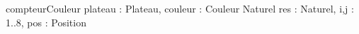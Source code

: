 \begin{algorithme}

  \fonction
      {compteurCouleur}
      {plateau : Plateau, couleur : Couleur}
      {Naturel}
      {res : Naturel, i,j : 1..8, pos : Position}
      {
             {
               {
                             {}
               }
             }
      }
         
\end{algorithme} 
